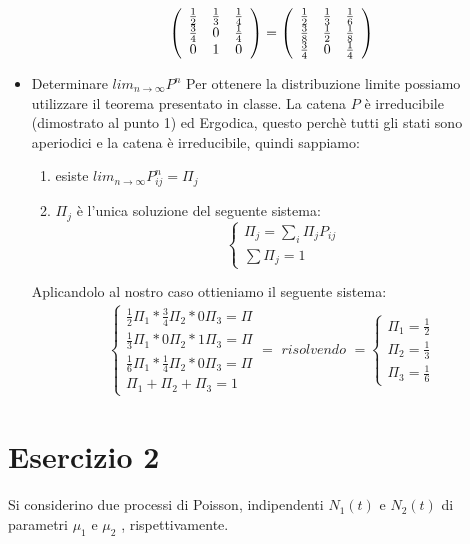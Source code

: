 \documentclass[a4paper]{article}
\begin{document}
\begin{itemize}
$$		\left(\begin{array}{c c c}{{\frac{1}{2}}}&{{\frac{1}{3}}}&{{\frac{1}{4}}}\\ {{\frac{3}{4}}}&{{0}}&{{\frac{1}{4}}}\\ {{0}}&{{1}}&{{0}}\end{array}\right)
		= \left(\begin{array}{c c c}{{\frac{1}{2}}}&{{\frac{1}{3}}}&{{\frac{1}{6}}}\\ {{\frac{3}{8}}}&{{\frac{1}{2}}}&{{\frac{1}{8}}}\\ {{\frac{3}{4}}}&{{0}}&{{\frac{1}{4}}}\end{array}\right) $$
	\item Determinare $lim_{n \rightarrow \infty}P^n$
		Per ottenere la distribuzione limite possiamo utilizzare il teorema presentato in classe. La catena $P$ è irreducibile (dimostrato al punto 1) ed Ergodica, questo perchè tutti gli stati sono aperiodici e la catena è irreducibile, quindi sappiamo:
		\begin{enumerate}
			\item esiste $lim_{n\rightarrow\infty}P^n_{ij}=\Pi_j$
			\item $\Pi_j$ è l'unica soluzione del seguente sistema: 
				\begin{equation*}
					\begin{cases} \Pi_j = \sum_i \Pi_j P_{ij}\\
						\sum \Pi_j = 1
					\end{cases}
				\end{equation*}
		\end{enumerate}
		Aplicandolo al nostro caso ottieniamo il seguente sistema:
		\begin{align*}
			\begin{cases}
				\frac{1}{2}\Pi_1 * \frac{3}{4}\Pi_2 * 0\Pi_3 = \Pi\\
				\frac{1}{3}\Pi_1 * 0\Pi_2 * 1\Pi_3 = \Pi\\
				\frac{1}{6}\Pi_1 * \frac{1}{4}\Pi_2 * 0\Pi_3 = \Pi\\
				\Pi_1 + \Pi_2 + \Pi_3 = 1
			\end{cases}
			= \textit{ risolvendo } = 
			\begin{cases}
				\Pi_1 = \frac{1}{2}\\
				\Pi_2 = \frac{1}{3}\\
				\Pi_3 = \frac{1}{6}
			\end{cases}
		\end{align*}
\end{itemize}
\section{Esercizio 2}
Si considerino due processi di Poisson, indipendenti $N_1(t)$ e $ N_2(t)$ di parametri $\mu_1$ e $\mu_2$ , rispettivamente.
\end{document}
